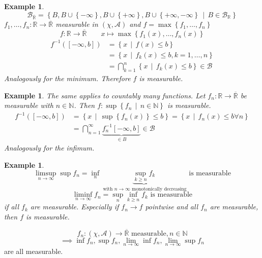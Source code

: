 \documentclass[a4paper]{article}
\newcounter{lecref}[section]
\numberwithin{lecref}{section}
\theoremstyle{break}
\newtheorem{example}[lecref]{Example}
\newcommand{\Set}[1]{\left\{#1\right\}}
\newcommand{\SetDef}[2]{\left\{#1\,\mid\,#2\right\}}
\newcommand{\Max}[1]{\max{\Set{#1}}}
\begin{document}
\begin{example} \hfill{}
  \[ \mathcal B_{\overline{\mathbb R}} = \SetDef{B, B \cup \Set{-\infty}, B \cup \Set{+\infty}, B \cup \Set{+\infty, -\infty}}{B \in \mathcal B_{\mathbb R}} \]
  $f_1, \dots, f_n: \mathbb R \to \overline{\mathbb R}$ measurable in $(\chi, \mathcal A)$ and $f = \Max{f_1, \dots, f_n}$
  \[ f: \mathbb R \to \overline{\mathbb R} \qquad x \mapsto \max\Set{f_1(x), \dots, f_n(x)} \]
  \begin{align*}
    f^{-1}([-\infty, b]) &= \SetDef{x}{f(x) \leq b} \\
      &= \SetDef{x}{f_k(x) \leq b, k = 1, \dots, n} \\
      &= \bigcap_{k=1}^n \SetDef{x}{f_k(x) \leq b} \in \mathcal B
  \end{align*}
  Analogously for the minimum.
  Therefore $f$ is measurable.
\end{example}

\begin{example}
  The same applies to countably many functions.
  Let $f_n: \mathbb R \to \overline{\mathbb R}$ be measurable with $n \in \mathbb N$.
  Then $f: \sup\SetDef{f_n}{n \in \mathbb N}$ is measurable.
  \begin{align*}
    f^{-1}([-\infty, b]) &= \SetDef{x}{\sup\Set{f_n(x)} \leq b} = \SetDef{x}{f_n(x) \leq b \forall n} \\
      &= \bigcap_{n=1}^\infty \underbrace{f_n^{-1} [-\infty, b]}_{\in B} \in \mathcal B
  \end{align*}
  Analogously for the infimum.
\end{example}

\begin{example}
  \[ \limsup_{n\to\infty} \sup{f_n} = \inf_n \underbrace{\sup_{k \geq n} f_k}_{\text{ with } n\to\infty \text{ monotonically decreasing}} \text{ is measurable} \]
  \[ \liminf_{n\to\infty} f_n = \sup_n \inf_{k \geq n} f_k \text{ is measurable} \]
  if all $f_k$ are measurable. Especially if $f_n \to f$ pointwise and all $f_n$ are measurable, then $f$ is measurable.
\end{example}

\begin{theorem}
  \[ f_n: (\chi, \mathcal A) \to \overline{\mathbb R} \text{ measurable}, n \in \mathbb N \]
  \[ \implies \inf{f_n}, \sup{f_n}, \lim_{n\to\infty} \inf{f_n}, \lim_{n\to\infty} \sup{f_n} \]
  are all measurable.
\end{theorem}
\end{document}

